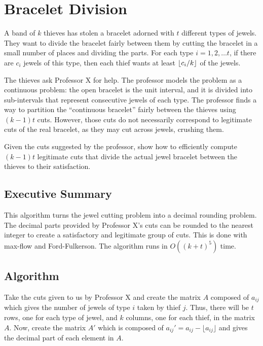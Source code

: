 \documentclass{6046}
\author{John Wang}
\begin{document}
\section{Bracelet Division}

{\em

A band of $k$ thieves has stolen a bracelet adorned with $t$ different types of
jewels. They want to divide the bracelet fairly between them by cutting the
bracelet in a small number of places and dividing the parts. For each type
$i=1,2,\ldots t$, if there are $c_i$ jewels of this type, then each thief wants
at least $\left\lfloor c_i/k \right\rfloor$ of the jewels.

The thieves ask Professor X for help.  The professor models the problem as a
continuous problem: the open bracelet is the unit interval, and it is divided
into sub-intervals that represent consecutive jewels of each type. The
professor finds a way to partition the ``continuous bracelet'' fairly between
the thieves using $(k-1)t$ cuts. However, those cuts do not necessarily
correspond to legitimate cuts of the real bracelet, as they may cut across
jewels, crushing them.

Given the cuts suggested by the professor, show how to efficiently compute
$(k-1)t$ legitimate cuts that divide the actual jewel bracelet between the
thieves to their satisfaction.

}

\subsection*{Executive Summary}

This algorithm turns the jewel cutting problem into a decimal rounding problem. The decimal parts provided by Professor X's cuts can be rounded to the nearest integer to create a satisfactory and legitimate group of cuts. This is done with max-flow and Ford-Fulkerson. The algorithm runs in $O((k+t)^5)$ time. 

\subsection*{Algorithm}

Take the cuts given to us by Professor X and create the matrix $A$ composed of $a_{ij}$ which gives the number of jewels of type $i$ taken by thief $j$. Thus, there will be $t$ rows, one for each type of jewel, and $k$ columns, one for each thief, in the matrix $A$. Now, create the matrix $A'$ which is composed of $a_{ij}' = a_{ij} - \lfloor a_{ij} \rfloor $ and gives the decimal part of each element in $A$. 
\end{document}
